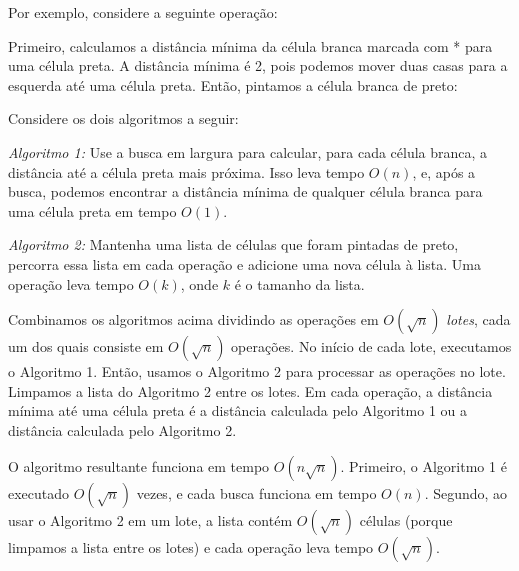 Por exemplo, considere a seguinte operação:

\begin{center}
\end{center}

Primeiro, calculamos a distância mínima
da célula branca marcada com * para uma célula preta.
A distância mínima é 2, pois podemos mover
duas casas para a esquerda até uma célula preta.
Então, pintamos a célula branca de preto:

\begin{center}
\end{center}

Considere os dois algoritmos a seguir:

\emph{Algoritmo 1:} Use a busca em largura
para calcular,
para cada célula branca, a distância até a célula preta mais próxima.
Isso leva tempo $O(n)$, e, após a busca,
podemos encontrar a distância mínima de qualquer célula branca
para uma célula preta em tempo $O(1)$.

\emph{Algoritmo 2:} Mantenha uma lista de células que foram
pintadas de preto, percorra essa lista em cada operação
e adicione uma nova célula à lista.
Uma operação leva tempo $O(k)$, onde $k$ é o tamanho da lista.

Combinamos os algoritmos acima
dividindo as operações em
$O(\sqrt n)$ \emph{lotes}, cada um dos quais consiste
em $O(\sqrt n)$ operações.
No início de cada lote,
executamos o Algoritmo 1.
Então, usamos o Algoritmo 2 para processar as operações
no lote.
Limpamos a lista do Algoritmo 2 entre
os lotes.
Em cada operação,
a distância mínima até uma célula preta
é a distância calculada pelo Algoritmo 1
ou a distância calculada pelo Algoritmo 2.

O algoritmo resultante funciona em
tempo $O(n \sqrt n)$.
Primeiro, o Algoritmo 1 é executado $O(\sqrt n)$ vezes,
e cada busca funciona em tempo $O(n)$.
Segundo, ao usar o Algoritmo 2 em um lote,
a lista contém $O(\sqrt n)$ células
(porque limpamos a lista entre os lotes)
e cada operação leva tempo $O(\sqrt n)$.

